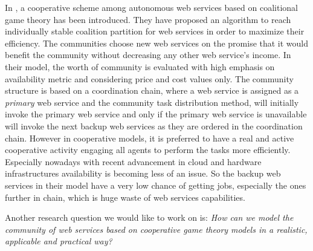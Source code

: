 



In \cite{10.1109/TSC.2012.12}, a cooperative scheme among autonomous
web services based on coalitional game theory has been introduced. They have proposed an algorithm to
reach individually stable coalition partition for web services in order to
maximize their efficiency. The communities choose new web services on the promise
that it would benefit the community without decreasing any other web service's
income. In their model, the worth of community is evaluated with high emphasis on
availability metric and considering price and cost values only. The community structure is based on a coordination chain,
where a web service is assigned as a \emph{primary} web service and the community task distribution
method, will initially invoke the primary web service and only if the primary web service is unavailable
will invoke the next backup web services as they are ordered in the coordination chain. However in cooperative models, it is preferred to
have a real and active cooperative activity engaging all agents to perform the tasks more efficiently. Especially nowadays
with recent advancement in cloud and hardware infrastructures availability is becoming less of an issue. So the backup web services
in their model have a very low chance of getting jobs, especially the ones further in chain, which is huge waste of web services
capabilities.

Another research question we would like to work on is:
\emph{How can we model the community of web services based on cooperative game theory models in a realistic, applicable and practical way?}


